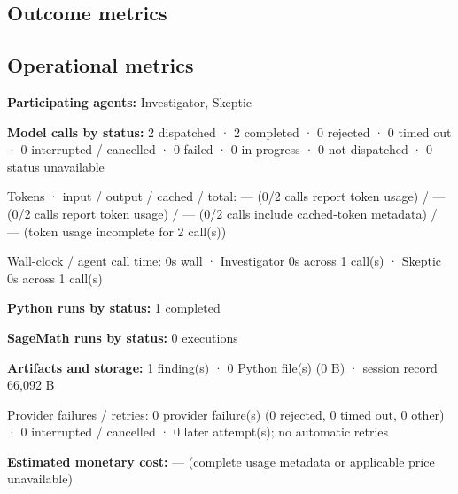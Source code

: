 \documentclass[11pt]{article}
\begin{document}
\subsection{Outcome metrics}
\subsection{Operational metrics}
\textbf{Participating agents:} Investigator, Skeptic\par
\textbf{Model calls by status:} 2 dispatched · 2 completed · 0 rejected · 0 timed out · 0 interrupted / cancelled · 0 failed · 0 in progress · 0 not dispatched · 0 status unavailable\par
Tokens · input / output / cached / total: — (0/2 calls report token usage) / — (0/2 calls report token usage) / — (0/2 calls include cached-token metadata) / — (token usage incomplete for 2 call(s))\par
Wall-clock / agent call time: 0s wall · Investigator 0s across 1 call(s) · Skeptic 0s across 1 call(s)\par
\textbf{Python runs by status:} 1 completed\par
\textbf{SageMath runs by status:} 0 executions\par
\textbf{Artifacts and storage:} 1 finding(s) · 0 Python file(s) (0 B) · session record 66,092 B\par
Provider failures / retries: 0 provider failure(s) (0 rejected, 0 timed out, 0 other) · 0 interrupted / cancelled · 0 later attempt(s); no automatic retries\par
\textbf{Estimated monetary cost:} — (complete usage metadata or applicable price unavailable)\par
\end{document}
